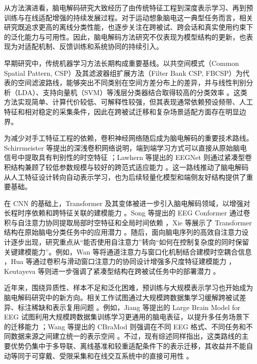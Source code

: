 从方法演进看，脑电解码研究大致经历了由传统特征工程到深度表示学习、再到预训练与在线适配增强的持续发展过程。对于运动想象脑电这一典型任务而言，相关研究既追求更高的离线分类性能，也逐步关注在跨被试、跨会话和真实使用约束下的泛化能力与可用性。因此，脑电解码方法研究不仅表现为模型结构的更新，也表现为对适配机制、反馈训练和系统协同的持续引入。

早期研究中，传统机器学习方法长期构成重要基线。以共空间模式（Common Spatial Pattern, CSP）及其滤波器组扩展方法（Filter Bank CSP, FBCSP）为代表的空间滤波路线，能够突出不同类别在空间方差分布上的差异，并与线性判别分析（LDA）、支持向量机（SVM）等浅层分类器结合取得较高的分类效率 \cite{ang2012filter, lotte2018review}。这类方法实现简单、计算代价较低、可解释性较强，但其表现通常依赖预设频带、人工特征和相对稳定的采集条件，因此在跨被试迁移和复杂场景适配方面存在明显边界。

为减少对手工特征工程的依赖，卷积神经网络随后成为脑电解码的重要技术路线。Schirrmeister 等提出的深浅卷积网络说明，端到端学习方式可以直接从原始脑电信号中提取具有判别性的时空特征 \cite{schirrmeister2017deep}；Lawhern 等提出的 EEGNet 则通过紧凑型卷积结构兼顾了较低参数规模与较好的跨范式适应能力 \cite{lawhern2018eegnet}。这一路线推动了脑电解码从人工特征设计转向自动表示学习，也为后续轻量化模型和端侧友好结构提供了重要基础。

在 CNN 的基础上，Transformer 及其变体被进一步引入脑电解码领域，以增强对长程时序依赖和跨特征关联的建模能力 \cite{vaswani2017attention}。Song 等提出的 EEG Conformer 通过卷积与自注意力协同提取局部时空特征和全局时间依赖 \cite{songEEG2022}，Xie 等展示了 Transformer 结构在原始脑电分类任务中的应用潜力 \cite{xie_transformer-based_2022}。随后，面向脑电序列的高效自注意力设计逐步出现，研究重点从“能否使用自注意力”转向“如何在控制复杂度的同时保留关键建模能力”。例如，Wan 等将通道注意力与窗口化机制结合建模时空耦合信息 \cite{wan2023novel}，Hua 等通过卷积与滑动窗口注意力的协同设计增强多尺度特征建模能力 \cite{hua2023improved}，Keutayeva 等则进一步强调了紧凑型结构在跨被试任务中的部署潜力 \cite{keu2024compact}。

近年来，围绕异质性、样本不足和泛化困难，预训练与大规模表示学习也开始成为脑电解码研究中的新方向。相关工作试图通过大规模跨数据集学习缓解跨被试差异、标注稀缺和表示复用问题 \cite{Jia24, Wan24b}。例如，Jiang 等提出的 Large Brain Model for EEG 试图利用大规模跨数据集训练学习更通用的脑电表征，以提升多任务场景下的迁移能力 \cite{Jia24}；Wang 等提出的 CBraMod 则强调在不同 EEG 格式、不同任务和不同数据来源之间建立统一的表示空间 \cite{Wan24b}。不过，现有综述同样指出，这类路线的主要优势仍集中于多导联、离线基准和较重适配条件下的表示迁移，其收益并不能自动等同于可穿戴、受限采集和在线交互系统中的直接可用性 \cite{Liu26b}。

